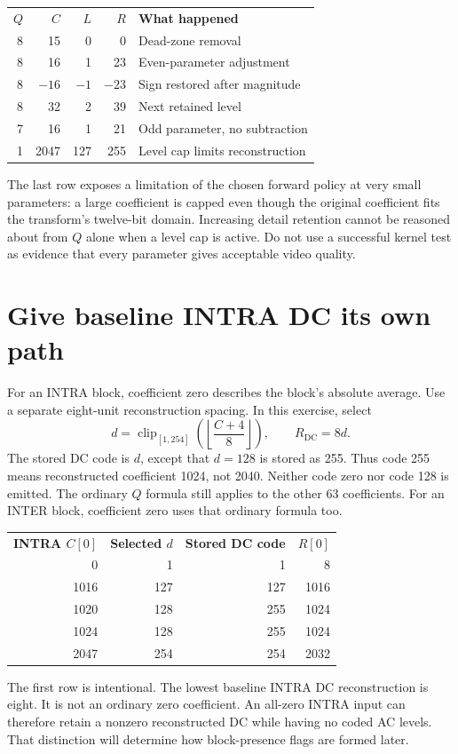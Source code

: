 \begin{center}
\begin{tabular}{rrrrl}
\textbf{$Q$} & \textbf{$C$} & \textbf{$L$} & \textbf{$R$} & \textbf{What happened}\\
8 & 15 & 0 & 0 & Dead-zone removal\\
8 & 16 & 1 & 23 & Even-parameter adjustment\\
8 & $-16$ & $-1$ & $-23$ & Sign restored after magnitude\\
8 & 32 & 2 & 39 & Next retained level\\
7 & 16 & 1 & 21 & Odd parameter, no subtraction\\
1 & 2047 & 127 & 255 & Level cap limits reconstruction
\end{tabular}
\end{center}
The last row exposes a limitation of the chosen forward policy at very small
parameters: a large coefficient is capped even though the original coefficient
fits the transform's twelve-bit domain. Increasing detail retention cannot be
reasoned about from $Q$ alone when a level cap is active. Do not use a successful
kernel test as evidence that every parameter gives acceptable video quality.

\section{Give baseline INTRA DC its own path}
For an INTRA block, coefficient zero describes the block's absolute average.
Use a separate eight-unit reconstruction spacing. In this exercise, select
\[
 d=\operatorname{clip}_{[1,254]}\!\left(\left\lfloor\frac{C+4}{8}\right\rfloor\right),
 \qquad R_{\mathrm{DC}}=8d.
\]
The stored DC code is $d$, except that $d=128$ is stored as 255. Thus code 255
means reconstructed coefficient 1024, not 2040. Neither code zero nor code 128
is emitted. The ordinary $Q$ formula still applies to the other 63 coefficients.
For an INTER block, coefficient zero uses that ordinary formula too.

\begin{center}
\begin{tabular}{rrrr}
\textbf{INTRA $C[0]$} & \textbf{Selected $d$} & \textbf{Stored DC code} & \textbf{$R[0]$}\\
0 & 1 & 1 & 8\\
1016 & 127 & 127 & 1016\\
1020 & 128 & 255 & 1024\\
1024 & 128 & 255 & 1024\\
2047 & 254 & 254 & 2032
\end{tabular}
\end{center}
The first row is intentional. The lowest baseline INTRA DC reconstruction is
eight. It is not an ordinary zero coefficient. An all-zero INTRA input can
therefore retain a nonzero reconstructed DC while having no coded AC levels.
That distinction will determine how block-presence flags are formed later.


